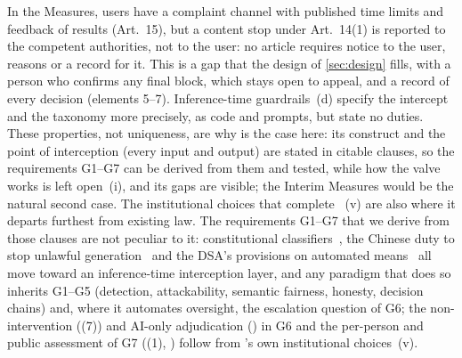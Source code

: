 In the Measures, users have a complaint channel with published time limits and feedback of results (Art.~15), but a content stop under Art.~14(1) is reported to the competent authorities, not to the user: no article requires notice to the user, reasons or a record for it.
This is a gap that the design of \cref{sec:design} fills, with a person who confirms any final block, which stays open to appeal, and a record of every decision (elements 5--7).
Inference-time guardrails~(d) specify the intercept and the taxonomy more precisely, as code and prompts, but state no duties.
These properties, not uniqueness, are why \pol{} is the case here: its construct and the point of interception (every input and output) are stated in citable clauses, so the requirements G1--G7 can be derived from them and tested, while how the valve works is left open~(i), and its gaps are visible; the Interim Measures would be the natural second case.
The institutional choices that complete \pol{}~(v) are also where it departs furthest from existing law.
The requirements G1--G7 that we derive from those clauses are not peculiar to it: constitutional classifiers~\cite{sharma2025constitutional}, the Chinese duty to stop unlawful generation~\cite{cac2023genai} and the DSA's provisions on automated means~\cite{dsa2022} all move toward an inference-time interception layer, and any paradigm that does so inherits G1--G5 (detection, attackability, semantic fairness, honesty, decision chains) and, where it automates oversight, the escalation question of G6; the non-intervention ((7)) and AI-only adjudication () in G6 and the per-person and public assessment of G7 ((1), ) follow from \pol{}'s own institutional choices~(v).
